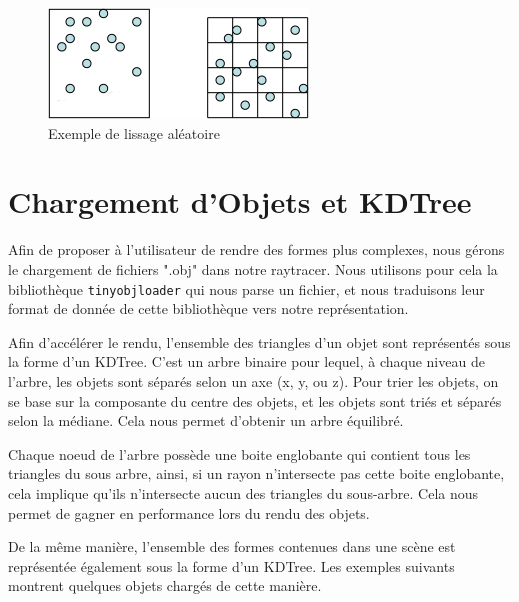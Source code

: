 \documentclass{article}
\begin{document}
\begin{figure}[h]
\begin{center}
  \includegraphics{images/smoothing.png}
  \caption*{Exemple de lissage aléatoire}
\end{center}
\end{figure}

\clearpage

\section{Chargement d'Objets et KDTree}

Afin de proposer à l'utilisateur de rendre des formes plus complexes, nous
gérons le chargement de fichiers ".obj" dans notre raytracer. Nous utilisons
pour cela la bibliothèque \texttt{tinyobjloader} qui nous parse un fichier, et
nous traduisons leur format de donnée de cette bibliothèque vers notre
représentation.

Afin d'accélérer le rendu, l'ensemble des triangles d'un objet sont représentés
sous la forme d'un KDTree. C'est un arbre binaire pour lequel, à chaque niveau
de l'arbre, les objets sont séparés selon un axe (x, y, ou z). Pour trier les
objets, on se base sur la composante du centre des objets, et les objets sont
triés et séparés selon la médiane. Cela nous permet d'obtenir un arbre
équilibré.

Chaque noeud de l'arbre possède une boite englobante qui contient tous les
triangles du sous arbre, ainsi, si un rayon n'intersecte pas cette boite
englobante, cela implique qu'ils n'intersecte aucun des triangles du
sous-arbre. Cela nous permet de gagner en performance lors du rendu des objets.

De la même manière, l'ensemble des formes contenues dans une scène est
représentée également sous la forme d'un KDTree. Les exemples suivants montrent
quelques objets chargés de cette manière.
\end{document}
